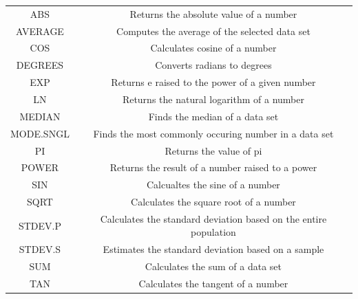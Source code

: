 \begin{center}
\begin{tabular}{c | c}
ABS & Returns the absolute value of a number \\
AVERAGE & Computes the average of the selected data set \\
COS & Calculates cosine of a number\\
DEGREES & Converts radians to degrees \\
EXP & Returns e raised to the power of a given number \\
LN & Returns the natural logarithm of a number \\
MEDIAN & Finds the median of a data set \\
MODE.SNGL & Finds the most commonly occuring number in a data set\\
PI & Returns the value of pi\\
POWER & Returns the result of a number raised to a power\\
SIN & Calcualtes the sine of a number\\
SQRT & Calculates the square root of a number\\
STDEV.P & Calculates the standard deviation based on the entire population \\
STDEV.S & Estimates the standard deviation based on a sample \\
SUM & Calculates the sum of a data set\\
TAN & Calculates the tangent of a number
\end{tabular}
\end{center}

\newpage
